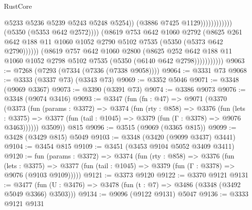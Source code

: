 \begin{lexlean}{RustCore}
\begin{coremodule}
                                                    @5233
                                                    @5236
                                                    @5239
                                                    @5243
                                                    @5248
                                                    @5254))
                                                (@3886 @7425 @1129))))))))))))
                          (@5350 (@5353 @642 @2572))))
                      (@8619
                        @753
                        @642
                        @1060
                        @2792
                        (@8625
                          @261
                          @642
                          @188
                          @11
                          @1060
                          @1052
                          @2790
                          @5102
                          @7535
                          (@5350 (@5373 @642 @2790))))))
                  (@8619
                    @757
                    @642
                    @1060
                    @2800
                    (@8625
                      @252
                      @642
                      @188
                      @11
                      @1060
                      @1052
                      @2798
                      @5102
                      @7535
                      (@5350 (@6140 @642 @2798)))))))))))
@9063 := @7268 (@7293 (@7334 (@7336 (@7338 @9058))))
@9064 := @3331 @73
@9068 := @3333 (@3337 @73) (@3343 @73)
@9069 := @3352 @5046
@9071 := @3348 (@9069 @3367)
@9073 := @3390 (@3391 @73)
@9074 := @3386 @9073
@9076 := @3348 (@9074 @3416)
@9093 := @3347
    (fun (fn : @47) =>
    @9071
      (@3370
        (@3373
          (fun (params : @3372) =>
          @3374
            (fun (rty : @858) =>
            @3376
              (fun (lets : @3375) =>
              @3377 (fun (tail : @1045) => @3379 (fun (Γ : @3378) => @9076 @3463))))))
        @3509))
    @815
@9096 := @3515 (@9069 (@3365 @815))
@9099 := @3428 (@3429 @815) @5049
@9103 := @3348 (@3420 (@9099 @3437) @3441)
@9104 := @3454 @815
@9109 := @3451 (@3453 @9104 @5052 @3409 @3411)
@9120 := fun (params : @3372) =>
  @3374
    (fun (rty : @858) =>
    @3376
      (fun (lets : @3375) =>
      @3377 (fun (tail : @1045) => @3379 (fun (Γ : @3378) => @9076 (@9103 @9109)))))
@9121 := @3373 @9120
@9122 := @3370 @9121
@9131 := @3477 (fun (U : @3476) => @3478 (fun (t : @7) => @3486 (@3348 (@3492 @5049 @3366) @3503)))
@9134 := @9096 (@9122 @9131) @5047
@9136 := @3333 @9121 @9131

\end{coremodule}
\end{lexlean}
